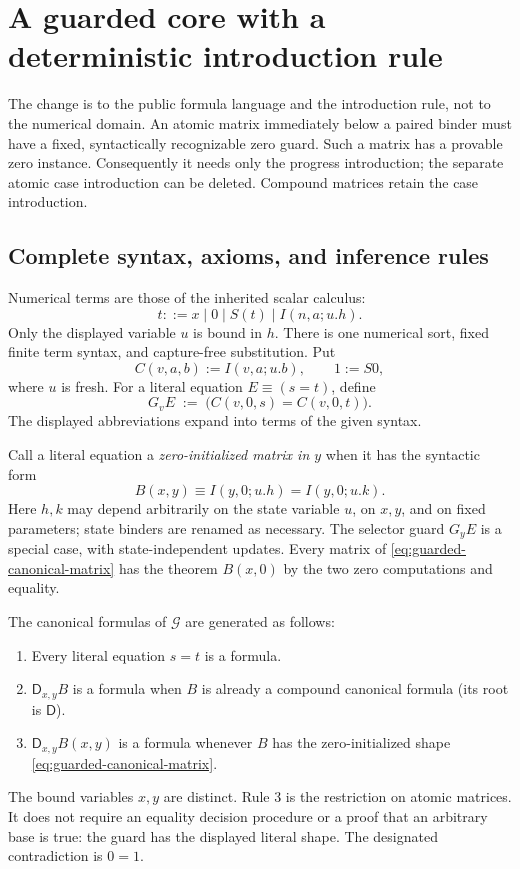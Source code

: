 
\section{A guarded core with a deterministic introduction rule}
\label{sec:guarded-core}

The change is to the public formula language and the introduction rule,
not to the numerical domain.  An atomic matrix immediately below a
paired binder must have a fixed, syntactically recognizable zero guard.
Such a matrix has a provable zero instance.  Consequently it needs only
the progress introduction; the separate atomic case introduction can
be deleted.  Compound matrices retain the case introduction.

\subsection{Complete syntax, axioms, and inference rules}

Numerical terms are those of the inherited scalar calculus:
\[
 t ::= x\mid 0\mid S(t)\mid I(n,a;u.h).
\]
Only the displayed variable $u$ is bound in $h$.  There is one numerical
sort, fixed finite term syntax, and capture-free substitution.  Put
\[
 C(v,a,b):=I(v,a;u.b),\qquad 1:=S0,
\]
where $u$ is fresh.  For a literal equation $E\equiv(s=t)$, define
\[
 G_v E\;:=\;\bigl(C(v,0,s)=C(v,0,t)\bigr).
\tag{Guard}\label{eq:guarded-guard}
\]
The displayed abbreviations expand into terms of the given syntax.

Call a literal equation a \emph{zero-initialized matrix in $y$} when it
has the syntactic form
\[
 B(x,y)\equiv
 I(y,0;u.h)=I(y,0;u.k).
 \tag{Canonical atomic matrix}\label{eq:guarded-canonical-matrix}
\]
Here $h,k$ may depend arbitrarily on the state variable $u$, on $x,y$,
and on fixed parameters; state binders are renamed as necessary.
The selector guard $G_yE$ is a special case, with state-independent
updates.  Every matrix of \eqref{eq:guarded-canonical-matrix} has the
theorem $B(x,0)$ by the two zero computations and equality.

The canonical formulas of $\mathcal G$ are generated as follows:
\begin{enumerate}
\item Every literal equation $s=t$ is a formula.
\item $\mathsf D_{x,y}B$ is a formula when $B$ is already a compound
      canonical formula (its root is $\mathsf D$).
\item $\mathsf D_{x,y}B(x,y)$ is a formula whenever $B$ has the
      zero-initialized shape \eqref{eq:guarded-canonical-matrix}.
\end{enumerate}
The bound variables $x,y$ are distinct.  Rule 3 is the restriction on
atomic matrices.  It does not require an equality decision procedure or
a proof that an arbitrary base is true: the guard has the displayed
literal shape.  The designated contradiction is $0=1$.

